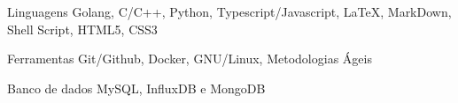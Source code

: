 
\begin{cvskills}
  \cvskill
  {Linguagens}
  {Golang, C/C++, Python, Typescript/Javascript, LaTeX, MarkDown, Shell Script, HTML5, CSS3}

  \cvskill
  {Ferramentas}
  {Git/Github, Docker, GNU/Linux, Metodologias Ágeis}

  \cvskill
  {Banco de dados}
  {MySQL, InfluxDB e MongoDB}


\end{cvskills}
